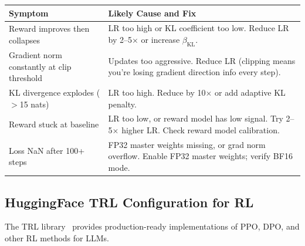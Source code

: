 \begin{examplebox}
{\small
\begin{tabular}{@{}lp{9.5cm}@{}}
\toprule
\textbf{Symptom} & \textbf{Likely Cause and Fix} \\
\midrule
Reward improves then collapses & LR too high or KL coefficient too low. Reduce LR by 2--5$\times$ or increase $\beta_\text{KL}$. \\
Gradient norm constantly at clip threshold & Updates too aggressive. Reduce LR (clipping means you’re losing gradient direction info every step). \\
KL divergence explodes ($>$15 nats) & LR too high. Reduce by 10$\times$ or add adaptive KL penalty. \\
Reward stuck at baseline & LR too low, or reward model has low signal. Try 2--5$\times$ higher LR. Check reward model calibration. \\
Loss NaN after 100+ steps & FP32 master weights missing, or grad norm overflow. Enable FP32 master weights; verify BF16 mode. \\
\bottomrule
\end{tabular}
}
\end{examplebox}

\subsection{HuggingFace TRL Configuration for RL}
\label{huggingface-trl-configuration-for-rl}

The TRL library~\cite{vonwerra2022trl} provides production-ready implementations of PPO, DPO, and other RL methods for LLMs.


